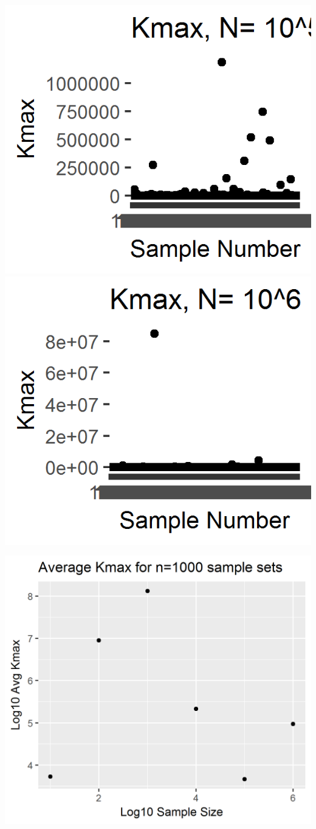 \includegraphics{../images/Problem6_10^5.png}
\includegraphics{../images/Problem6_10^6.png}

\includegraphics{../images/Problem6_average_max.png}